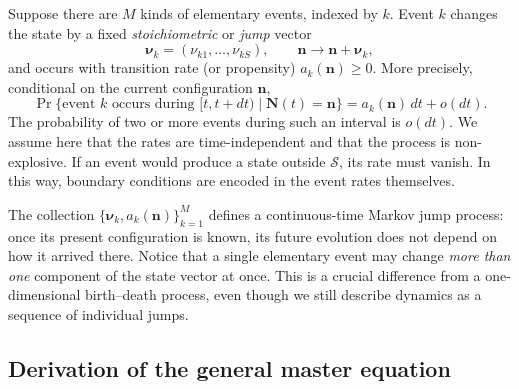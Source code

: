 Suppose there are $M$ kinds of elementary events, indexed by $k$. Event $k$
changes the state by a fixed \emph{stoichiometric} or \emph{jump} vector
\begin{equation}
    \boldsymbol\nu_k=(\nu_{k1},\ldots,\nu_{kS}),
    \qquad \mathbf n\longrightarrow\mathbf n+\boldsymbol\nu_k,
\end{equation}
and occurs with transition rate (or propensity) $a_k(\mathbf n)\geq 0$.
More precisely, conditional on the current configuration $\mathbf n$,
\begin{equation}
 \Pr\{\text{event $k$ occurs during }[t,t+dt)\mid\mathbf N(t)=\mathbf n\}
 =a_k(\mathbf n)\,dt+o(dt).
 \label{eq:multi-small-time}
\end{equation}
The probability of two or more events during such an interval is $o(dt)$.
We assume here that the rates are time-independent and that the process is
non-explosive. If an event would produce a state outside $\mathcal S$, its
rate must vanish. In this way, boundary conditions are encoded in the event
rates themselves.

The collection $\{\boldsymbol\nu_k,a_k(\mathbf n)\}_{k=1}^M$ defines a
continuous-time Markov jump process: once its present configuration is known,
its future evolution does not depend on how it arrived there. Notice that a
single elementary event may change \emph{more than one} component of the
state vector at once. This is a crucial difference from a one-dimensional
birth--death process, even though we still describe dynamics as a sequence of
individual jumps.

\subsection{Derivation of the general master equation}
\label{subsec:multi-derivation}

